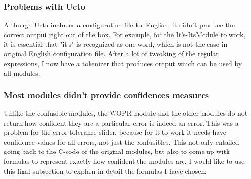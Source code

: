 \documentclass[12pt]{article}
\begin{document}
\subsubsection{Problems with Ucto}
Although Ucto includes a configuration file for English, it didn't produce the correct output right out of the box. For example, for the It's-ItsModule to work, it is essential that "it's" is recognized as one word, which is not the case in original English configuration file. After a lot of tweaking of the regular expressions, I now have a tokenizer that produces output which can be used by all modules.


\subsubsection{Most modules didn't provide confidences measures}
Unlike the confusible modules, the WOPR module and the other modules do not return how confident they are a particular error is indeed an error. This was a problem for the error tolerance slider, because for it to work it needs have confidence values for all errors, not just the confusibles. This not only entailed going back to the C-code of the original modules, but also to come up with formulas to represent exactly how confident the modules are. I would like to use this final subsection to explain in detail the formulas I have chosen:
\end{document}
